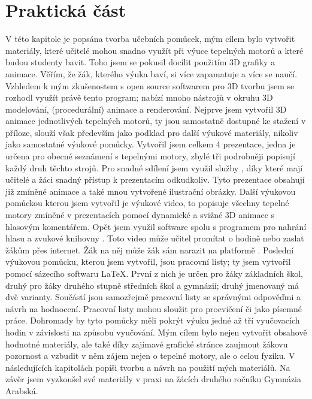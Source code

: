 \section{Praktická část}
{V této kapitole je popsána tvorba učebních pomůcek, mým cílem bylo vytvořit materiály, které učitelé mohou snadno využít při výuce tepelných motorů a které budou studenty bavit. Toho jsem se pokusil docílit použitím 3D grafiky a animace. Věřím, že žák, kterého výuka baví, si více zapamatuje a více se naučí.}\odst
{Vzhledem k mým zkušenostem s open source softwarem  pro 3D tvorbu jsem se rozhodl využít právě tento program; nabízí mnoho nástrojů v okruhu 3D modelování, (procedurální) animace a renderování. Nejprve jsem vytvořil 3D animace jednotlivých tepelných motorů, ty jsou samostatně dostupné ke stažení v příloze, slouží však především jako podklad pro další výukové materiály, nikoliv jako samostatné výukové pomůcky.}\odst
{Vytvořil jsem celkem 4 prezentace, jedna je určena pro obecné seznámení s tepelnými motory, zbylé tři podrobněji popisují každý druh těchto strojů. Pro snadné sdílení jsem využil služby , díky které mají učitelé a žáci snadný přístup k prezentacím odkudkoliv. Tyto prezentace obsahují již zmíněné animace a také mnou vytvořené ilustrační obrázky.}\odst
{Další výukovou pomůckou kterou jsem vytvořil je výukové video, to popisuje všechny tepelné motory zmíněné v prezentacích pomocí dynamické a svižné 3D animace s hlasovým komentářem. Opět jsem využil software  spolu s programem  pro nahrání hlasu a zvukové knihovny . Toto video může učitel promítat o hodině nebo zaslat žákům přes internet. Žák na něj může žák sám narazit na platformě .}\odst
{Poslední výukovou pomůcku, kterou jsem vytvořil, jsou pracovní listy; ty jsem vytvořil pomocí sázecího softwaru \LaTeX. První z nich je určen pro žáky základních škol, druhý pro žáky druhého stupně středních škol a gymnázií; druhý jmenovaný má dvě varianty. Součástí jsou samozřejmě pracovní listy se správnými odpověďmi a návrh na hodnocení. Pracovní listy mohou sloužit pro procvičení či jako písemné práce.}\odst
{Dohromady by tyto pomůcky měli pokrýt výuku jedné až tří vyučovacích hodin v závislosti na způsobu vyučování. Mým cílem bylo nejen vytvořit obsahově hodnotné materiály, ale také díky zajímavé grafické stránce zaujmout žákovu pozornost a vzbudit v něm zájem nejen o tepelné motory, ale o celou fyziku. V následujících kapitolách popíši tvorbu a návrh na použití mých materiálů. Na závěr jsem vyzkoušel své materiály v praxi na žácích druhého ročníku Gymnázia Arabská.}